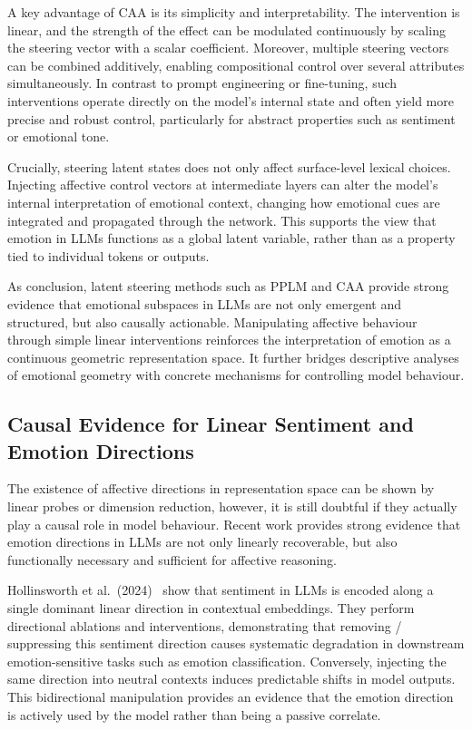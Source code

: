 \documentclass[12pt,twoside]{report}
\begin{document}
A key advantage of CAA is its simplicity and interpretability. The intervention is linear, and the strength of the effect can be modulated continuously by scaling the steering vector with a scalar coefficient. Moreover, multiple steering vectors can be combined additively, enabling compositional control over several attributes simultaneously. In contrast to prompt engineering or fine-tuning, such interventions operate directly on the model’s internal state and often yield more precise and robust control, particularly for abstract properties such as sentiment or emotional tone. 

Crucially, steering latent states does not only affect surface-level lexical choices. Injecting affective control vectors at intermediate layers can alter the model’s internal interpretation of emotional context, changing how emotional cues are integrated and propagated through the network. This supports the view that emotion in LLMs functions as a global latent variable, rather than as a property tied to individual tokens or outputs.

As conclusion, latent steering methods such as PPLM and CAA provide strong evidence that emotional subspaces in LLMs are not only emergent and structured, but also causally actionable. Manipulating affective behaviour through simple linear interventions reinforces the interpretation of emotion as a continuous geometric representation space. It further bridges descriptive analyses of emotional geometry with concrete mechanisms for controlling model behaviour.

\subsection{Causal Evidence for Linear Sentiment and Emotion Directions}

The existence of affective directions in representation space can be shown by linear probes or dimension reduction, however, it is still doubtful if they actually play a causal role in model behaviour. Recent work provides strong evidence that emotion directions in LLMs are not only linearly recoverable, but also functionally necessary and sufficient for affective reasoning.

Hollinsworth et al.\ (2024)~\cite{hollinsworth-etal-2024-language} show that sentiment in LLMs is encoded along a single dominant linear direction in contextual embeddings. They perform directional ablations and interventions, demonstrating that removing / suppressing this sentiment direction causes systematic degradation in downstream emotion-sensitive tasks such as emotion classification. Conversely, injecting the same direction into neutral contexts induces predictable shifts in model outputs. This bidirectional manipulation provides an evidence that the emotion direction is actively used by the model rather than being a passive correlate.
\end{document}

